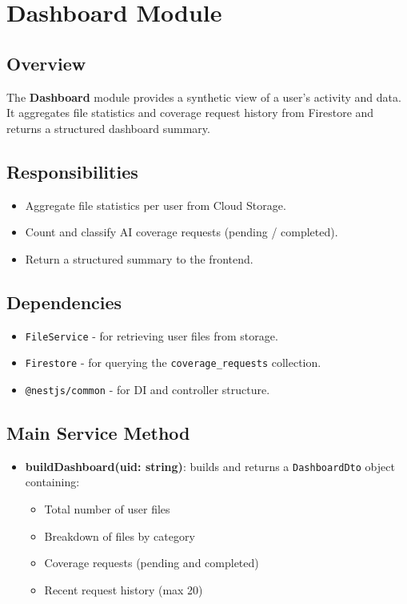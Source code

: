 \section{Dashboard Module}

\subsection*{Overview}

The \textbf{Dashboard} module provides a synthetic view of a user's activity and data. It aggregates file statistics and coverage request history from Firestore and returns a structured dashboard summary.

\subsection*{Responsibilities}

\begin{itemize}
    \item Aggregate file statistics per user from Cloud Storage.
    \item Count and classify AI coverage requests (pending / completed).
    \item Return a structured summary to the frontend.
\end{itemize}

\subsection*{Dependencies}

\begin{itemize}
    \item \texttt{FileService} - for retrieving user files from storage.
    \item \texttt{Firestore} - for querying the \texttt{coverage\_requests} collection.
    \item \texttt{@nestjs/common} - for DI and controller structure.
\end{itemize}

\subsection*{Main Service Method}

\begin{itemize}
    \item \textbf{buildDashboard(uid: string)}: builds and returns a \texttt{DashboardDto} object containing:
    \begin{itemize}
        \item Total number of user files
        \item Breakdown of files by category
        \item Coverage requests (pending and completed)
        \item Recent request history (max 20)
    \end{itemize}
\end{itemize}

